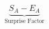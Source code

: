 \documentclass[preview]{standalone}
\begin{document}
\begin{align*}
\underbrace{S_A - E_A}_{\text{Surprise Factor}}
\end{align*}
\end{document}

